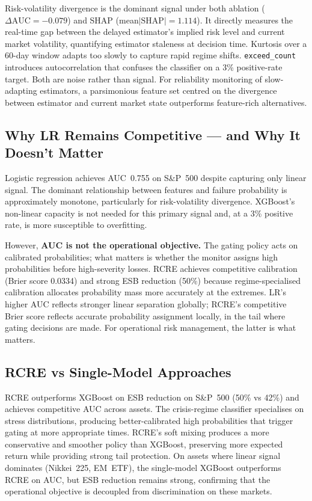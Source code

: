 \documentclass[sigconf, anonymous]{acmart}
\begin{document}
Risk-volatility divergence is the dominant signal under both ablation ($\Delta\text{AUC} = -0.079$) and SHAP (mean$|\text{SHAP}| = 1.114$). It directly measures the real-time gap between the delayed estimator's implied risk level and current market volatility, quantifying estimator staleness at decision time. Kurtosis over a 60-day window adapts too slowly to capture rapid regime shifts. \texttt{exceed\_count} introduces autocorrelation that confuses the classifier on a 3\% positive-rate target. Both are noise rather than signal. For reliability monitoring of slow-adapting estimators, a parsimonious feature set centred on the divergence between estimator and current market state outperforms feature-rich alternatives.

\subsection{Why LR Remains Competitive --- and Why It Doesn't Matter}
\label{sec:rcr-lr}

Logistic regression achieves AUC~0.755 on S\&P~500 despite capturing only linear signal. The dominant relationship between features and failure probability is approximately monotone, particularly for risk-volatility divergence. XGBoost's non-linear capacity is not needed for this primary signal and, at a 3\% positive rate, is more susceptible to overfitting.

However, \textbf{AUC is not the operational objective.} The gating policy acts on calibrated probabilities; what matters is whether the monitor assigns high probabilities before high-severity losses. RCRE achieves competitive calibration (Brier score 0.0334) and strong ESB reduction (50\%) because regime-specialised calibration allocates probability mass more accurately at the extremes. LR's higher AUC reflects stronger linear separation globally; RCRE's competitive Brier score reflects accurate probability assignment locally, in the tail where gating decisions are made. For operational risk management, the latter is what matters.

\subsection{RCRE vs Single-Model Approaches}

RCRE outperforms XGBoost on ESB reduction on S\&P~500 (50\% vs 42\%) and achieves competitive AUC across assets. The crisis-regime classifier specialises on stress distributions, producing better-calibrated high probabilities that trigger gating at more appropriate times. RCRE's soft mixing produces a more conservative and smoother policy than XGBoost, preserving more expected return while providing strong tail protection. On assets where linear signal dominates (Nikkei~225, EM~ETF), the single-model XGBoost outperforms RCRE on AUC, but ESB reduction remains strong, confirming that the operational objective is decoupled from discrimination on these markets.
\end{document}
